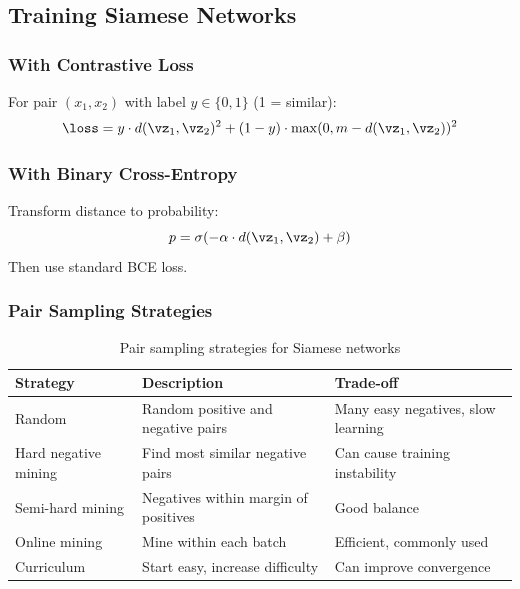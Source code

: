\subsection{Training Siamese Networks}

\subsubsection{With Contrastive Loss}

For pair $(x_1, x_2)$ with label $y \in \{0, 1\}$ (1 = similar):
\begin{equation}
\loss = y \cdot d(\vz_1, \vz_2)^2 + (1-y) \cdot \max(0, m - d(\vz_1, \vz_2))^2
\end{equation}

\subsubsection{With Binary Cross-Entropy}

Transform distance to probability:
\begin{equation}
p = \sigma(-\alpha \cdot d(\vz_1, \vz_2) + \beta)
\end{equation}
Then use standard BCE loss.

\subsubsection{Pair Sampling Strategies}

\begin{table}[H]
\centering
\caption{Pair sampling strategies for Siamese networks}
\begin{tabularx}{\textwidth}{lXX}
\toprule
\textbf{Strategy} & \textbf{Description} & \textbf{Trade-off} \\
\midrule
Random & Random positive and negative pairs & Many easy negatives, slow learning \\
Hard negative mining & Find most similar negative pairs & Can cause training instability \\
Semi-hard mining & Negatives within margin of positives & Good balance \\
Online mining & Mine within each batch & Efficient, commonly used \\
Curriculum & Start easy, increase difficulty & Can improve convergence \\
\bottomrule
\end{tabularx}
\end{table}

